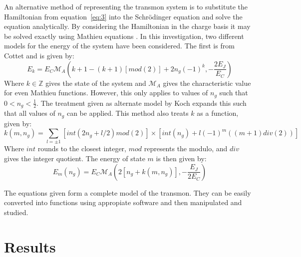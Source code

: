 \documentclass[11pt]{article}
\begin{document}
An alternative method of representing the transmon system is to substitute the Hamiltonian from equation~\ref{eq:3} into the Schr\"odinger equation and solve the equation analytically.
By considering the Hamiltonian in the charge basis it may be solved exactly using Mathieu equations \cite{rubyApplicationsMathieuEquation1996}. In this investigation, two different models for the energy of the system have been considered. The first is from Cottet \cite{cottetImplementationQuantumBit2002} and is given by:
\begin{equation} \label{eq:7}
E_k = E_C \mathcal{M}_A (k+1 - (k+1)[mod(2)] + 2n_g(-1)^k, -\frac{2E_J}{E_C})
\end{equation}
Where $k \in \mathbb{Z}$ gives the state of the system and $\mathcal{M}_A$ gives the characteristic value for even Mathieu functions. However, this only applies to values of $n_g$ such that $0 < n_g < \frac{1}{2}$. The treatment given as alternate model by Koch \cite{kochChargeinsensitiveQubitDesign2007} expands this such that all values of $n_g$ can be applied. This method also treats $k$ as a function, given by:
\begin{equation} \label{eq:8}
k(m, n_g) = \sum_{l=\pm 1} [int(2n_g + l/2)mod(2)] \times [int(n_g) + l(-1)^m ((m+1)div(2))]
\end{equation}
Where $int$ rounds to the closest integer, $mod$ represents the modulo, and $div$ gives the integer quotient.  The energy of state $m$ is then given by:
\begin{equation} \label{eq:9}
E_m(n_g) = E_C \mathcal{M}_A (2[n_g + k(m,n_g)],-\frac{E_J}{2E_C})
\end{equation}

The equations given form a complete model of the transmon. They can be easily converted into functions using appropiate software and then manipulated and studied. 

\section{Results}
\end{document}
